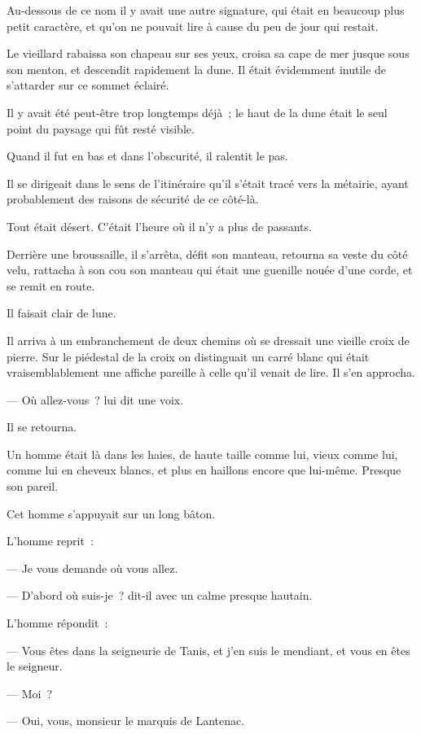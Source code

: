 \documentclass[french,twoside]{book} %
\newcommand{\byline}[1]{\bigskip{\RaggedLeft{#1}\par}\bigskip}
\begin{document}
\byline{« P{\scshape rieur de la} M{\scshape arne}. »}
\noindent Au-dessous de ce nom il y avait une autre signature, qui était en beaucoup plus petit caractère, et qu’on ne pouvait lire à cause du peu de jour qui restait.\par
Le vieillard rabaissa son chapeau sur ses yeux, croisa sa cape de mer jusque sous son menton, et descendit rapidement la dune. Il était évidemment inutile de s’attarder sur ce sommet éclairé.\par
Il y avait été peut-être trop longtemps déjà ; le haut de la dune était le seul point du paysage qui fût resté visible.\par
Quand il fut en bas et dans l’obscurité, il ralentit le pas.\par
Il se dirigeait dans le sens de l’itinéraire qu’il s’était tracé vers la métairie, ayant probablement des raisons de sécurité de ce côté-là.\par
Tout était désert. C’était l’heure où il n’y a plus de passants.\par
Derrière une broussaille, il s’arrêta, défit son manteau, retourna sa veste du côté velu, rattacha à son cou son manteau qui était une guenille nouée d’une corde, et se remit en route.\par
 Il faisait clair de lune.\par
Il arriva à un embranchement de deux chemins où se dressait une vieille croix de pierre. Sur le piédestal de la croix on distinguait un carré blanc qui était vraisemblablement une affiche pareille à celle qu’il venait de lire. Il s’en approcha.\par
— Où allez-vous ? lui dit une voix.\par
Il se retourna.\par
Un homme était là dans les haies, de haute taille comme lui, vieux comme lui, comme lui en cheveux blancs, et plus en haillons encore que lui-même. Presque son pareil.\par
Cet homme s’appuyait sur un long bâton.\par
L’homme reprit :\par
— Je vous demande où vous allez.\par
— D’abord où suis-je ? dit-il avec un calme presque hautain.\par
L’homme répondit :\par
— Vous êtes dans la seigneurie de Tanis, et j’en suis le mendiant, et vous en êtes le seigneur.\par
— Moi ?\par
— Oui, vous, monsieur le marquis de Lantenac.
\end{document}
